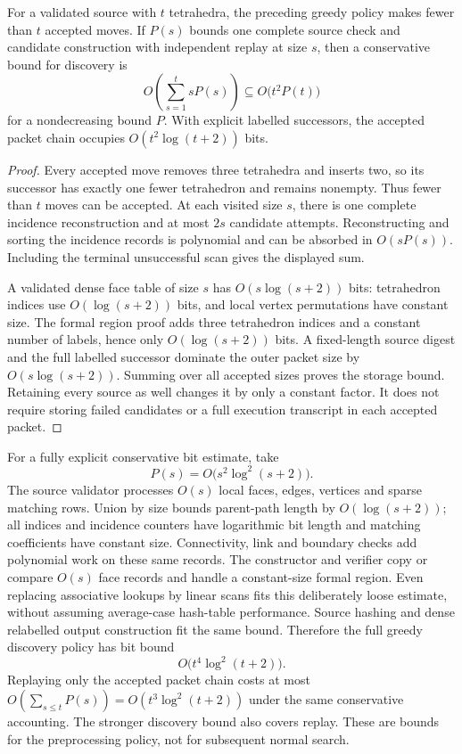 \begin{proposition}
\label{prop:strict-pachner32-cost}
For a validated source with $t$ tetrahedra, the preceding greedy policy
makes fewer than $t$ accepted moves.  If $P(s)$ bounds one complete
source check and candidate construction with independent replay at size
$s$, then a conservative bound for discovery is
\[
 O\!\left(\sum_{s=1}^{t}sP(s)\right)
 \subseteq O\bigl(t^2P(t)\bigr)
\]
for a nondecreasing bound $P$.  With explicit labelled successors, the
accepted packet chain occupies $O(t^2\log(t+2))$ bits.
\end{proposition}
\begin{proof}
Every accepted move removes three tetrahedra and inserts two, so its
successor has exactly one fewer tetrahedron and remains nonempty.
Thus fewer than $t$ moves can be accepted.  At each visited size $s$,
there is one complete incidence reconstruction and at most $2s$
candidate attempts.  Reconstructing and sorting the incidence records
is polynomial and can be absorbed in $O(sP(s))$.  Including the terminal
unsuccessful scan gives the displayed sum.

A validated dense face table of size $s$ has $O(s\log(s+2))$ bits:
tetrahedron indices use $O(\log(s+2))$ bits, and local vertex
permutations have constant size.  The formal region proof adds three
tetrahedron indices and a constant number of labels, hence only
$O(\log(s+2))$ bits.  A fixed-length source digest and the full labelled
successor dominate the outer packet size by
$O(s\log(s+2))$.  Summing over all accepted sizes proves the storage
bound.  Retaining every source as well changes it by only a constant
factor.  It does not require storing failed candidates or a full
execution transcript in each accepted packet.
\end{proof}

For a fully explicit conservative bit estimate, take
\[
 P(s)=O\bigl(s^2\log^2(s+2)\bigr).
\]
The source validator processes $O(s)$ local faces, edges, vertices and
sparse matching rows.  Union by size bounds parent-path length by
$O(\log(s+2))$; all indices and incidence counters have logarithmic bit
length and matching coefficients have constant size.  Connectivity,
link and boundary checks add polynomial work on these same records.
The constructor and verifier copy or compare $O(s)$ face records and
handle a constant-size formal region.  Even replacing associative
lookups by linear scans fits this deliberately loose estimate, without
assuming average-case hash-table performance.  Source hashing and dense
relabelled output construction fit the same bound.  Therefore the full
greedy discovery policy has bit bound
\[
 O\bigl(t^4\log^2(t+2)\bigr).
\]
Replaying only the accepted packet chain costs at most
$O(\sum_{s\le t}P(s))=O(t^3\log^2(t+2))$ under the same conservative
accounting.  The stronger discovery bound also covers replay.  These are
bounds for the preprocessing policy, not for subsequent normal search.

